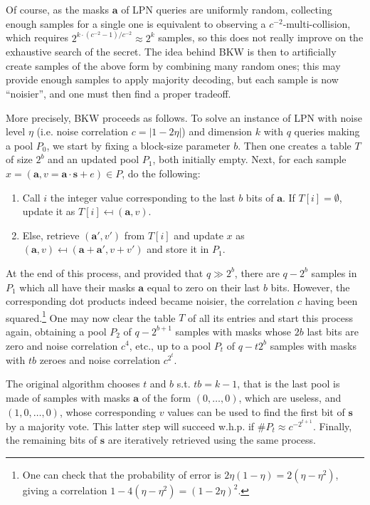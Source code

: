\documentclass[11pt,a4paper]{article}
\theoremstyle{definition}
\begin{document}
Of course, as the masks $\bm{a}$ of LPN queries are uniformly random, collecting enough samples for a single one is equivalent to observing a $c^{-2}$-multi-collision, which
requires $2^{k\cdot(c^{-2}-1)/c^{-2}} \approx 2^k$ samples, so this does not really improve on the exhaustive search of the secret. The idea behind BKW is then to artificially
create samples of the above form by combining many random ones; this may provide enough samples to apply majority decoding, but each sample is now ``noisier'', and one must then find
a proper tradeoff.

More precisely, BKW proceeds as follows. To solve an instance of LPN with noise level $\eta$ (i.e. noise correlation $c = |1-2\eta|$) and dimension $k$ with $q$ queries making a pool $P_0$, we start by fixing
a block-size parameter $b$. Then one creates a table $T$ of size $2^b$ and an updated pool $P_1$, both initially empty. Next, for each sample  $x = (\bm{a}, v = \bm{a}\cdot\bm{s} +e) \in P$, do the following:
\begin{enumerate}
	\item Call $i$ the integer value corresponding to the last $b$ bits of $\bm{a}$. If $T[i] = \emptyset$, update it as $T[i] \mapsfrom (\bm{a}, v)$.
	\item Else, retrieve $(\bm{a}',v')$ from $T[i]$ and update $x$ as $(\bm{a},v) \mapsfrom (\bm{a}+\bm{a}',v+v')$ and store it in $P_1$.
\end{enumerate}
At the end of this process, and provided that $q \gg 2^b$, there are $q-2^b$ samples in $P_1$ which all have their masks $\bm{a}$ equal to zero on their last $b$ bits. However, the corresponding dot
products indeed became noisier, the correlation $c$ having been squared.\footnote{One can check that the probability of error is $2\eta(1-\eta) = 2(\eta-\eta^2)$, giving a correlation
$1-4(\eta-\eta^2) = (1-2\eta)^2$.} One may now clear the table $T$ of all its entries and start this process again, obtaining a pool $P_2$ of $q - 2^{b+1}$ samples with masks whose
$2b$ last bits are zero and noise correlation $c^4$, etc., up to a pool $P_t$ of $q - t2^b$ samples with masks with $tb$ zeroes and noise correlation $c^{2^t}$.

The original algorithm chooses $t$ and $b$ s.t. $tb = k-1$, that is the last pool is made of samples with masks $\bm{a}$ of the form $(0,\ldots,0)$, which are useless, and $(1,0,\ldots,0)$,
whose corresponding $v$ values can be used to find the first bit of $\bm{s}$ by a majority vote. This latter step will succeed w.h.p. if $\#P_t \approx c^{-2^{t+1}}$. Finally, the remaining
bits of $\bm{s}$ are iteratively retrieved using the same process.
\end{document}

